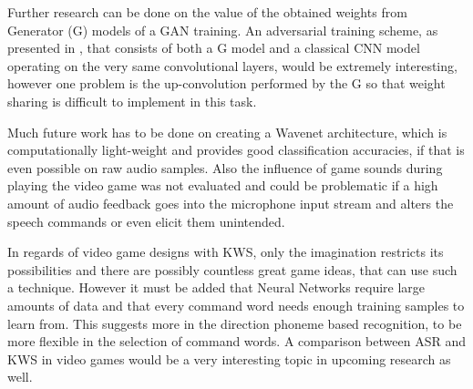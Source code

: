 Further research can be done on the value of the obtained weights from Generator (G) models of a GAN training. 
An adversarial training scheme, as presented in \cite{Oezdenizci2020}, that consists of both a G model and a classical CNN model operating on the very same convolutional layers, would be extremely interesting, however one problem is the up-convolution performed by the G so that weight sharing is difficult to implement in this task.

Much future work has to be done on creating a Wavenet architecture, which is computationally light-weight and provides good classification accuracies, if that is even possible on raw audio samples.
Also the influence of game sounds during playing the video game was not evaluated and could be problematic if a high amount of audio feedback goes into the microphone input stream and alters the speech commands or even elicit them unintended.

In regards of video game designs with KWS, only the imagination restricts its possibilities and there are possibly countless great game ideas, that can use such a technique.
However it must be added that Neural Networks require large amounts of data and that every command word needs enough training samples to learn from.
This suggests more in the direction phoneme based recognition, to be more flexible in the selection of command words.
A comparison between ASR and KWS in video games would be a very interesting topic in upcoming research as well.